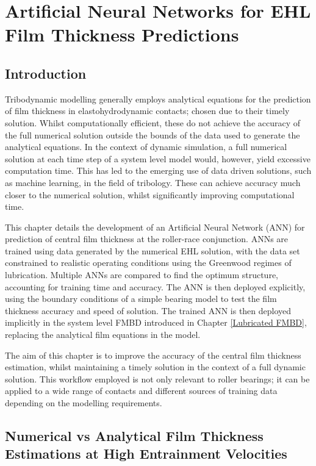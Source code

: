 \chapter{Artificial Neural Networks for EHL Film Thickness Predictions}
\label{ANN Lubricated Bearing FMBD}

\section{Introduction}

Tribodynamic modelling generally employs analytical equations for the prediction of film thickness in elastohydrodynamic contacts; chosen due to their timely solution. Whilst computationally efficient, these do not achieve the accuracy of the full numerical solution outside the bounds of the data used to generate the analytical equations. In the context of dynamic simulation, a full numerical solution at each time step of a system level model would, however, yield excessive computation time. This has led to the emerging use of data driven solutions, such as machine learning, in the field of tribology. These can achieve accuracy much closer to the numerical solution, whilst significantly improving computational time.

This chapter details the development of an Artificial Neural Network (ANN) for prediction of central film thickness at the roller-race conjunction. ANNs are trained using data generated by the numerical EHL solution, with the data set constrained to realistic operating conditions using the Greenwood regimes of lubrication. Multiple ANNs are compared to find the optimum structure, accounting for training time and accuracy. The ANN is then deployed explicitly, using the boundary conditions of a simple bearing model to test the film thickness accuracy and speed of solution. The trained ANN is then deployed implicitly in the system level FMBD introduced in Chapter \ref{Lubricated FMBD}, replacing the analytical film equations in the model.

The aim of this chapter is to improve the accuracy of the central film thickness estimation, whilst maintaining a timely solution in the context of a full dynamic solution. This workflow employed is not only relevant to roller bearings; it can be applied to a wide range of contacts and different sources of training data depending on the modelling requirements.

\section{Numerical vs Analytical Film Thickness Estimations at High Entrainment Velocities} 
\label{Numerical vs Analytical Film Thickness Estimations at High Entrainment Velocities}

